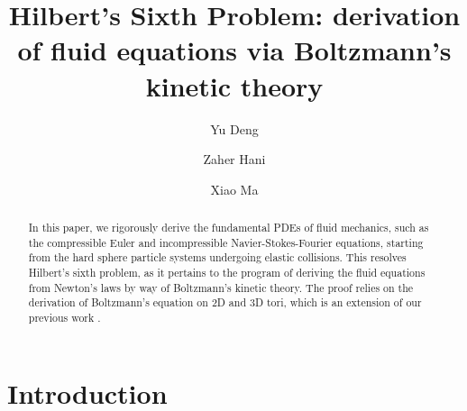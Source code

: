 \documentclass[10pt, reqno]{amsart}
\theoremstyle{definition}
\theoremstyle{remark}
\numberwithin{equation}{section}
\begin{document}
\title{Hilbert's Sixth Problem: derivation of fluid equations via Boltzmann's kinetic theory}

\author{Yu Deng}
\address{\textsc{Department of Mathematics, University of Chicago, Chicago, IL, USA}}
\author{Zaher Hani}
\address{\textsc{Department of Mathematics, University of Michigan, Ann Arbor, MI, USA}}
\author{Xiao Ma}
\address{\textsc{Department of Mathematics, University of Michigan, Ann Arbor, MI, USA}}
\date{}

\begin{abstract} In this paper, we rigorously derive the fundamental PDEs of fluid mechanics, such as the compressible Euler and incompressible Navier-Stokes-Fourier equations, starting from the hard sphere particle systems undergoing elastic collisions. This resolves Hilbert's sixth problem, as it pertains to the program of deriving the fluid equations from Newton's laws by way of Boltzmann's kinetic theory. The proof relies on the derivation of Boltzmann's equation on 2D and 3D tori, which is an extension of our previous work \cite{DHM24}. 
\end{abstract}

\maketitle
\tableofcontents

\section{Introduction}\label{sec.intro}
\end{document}
